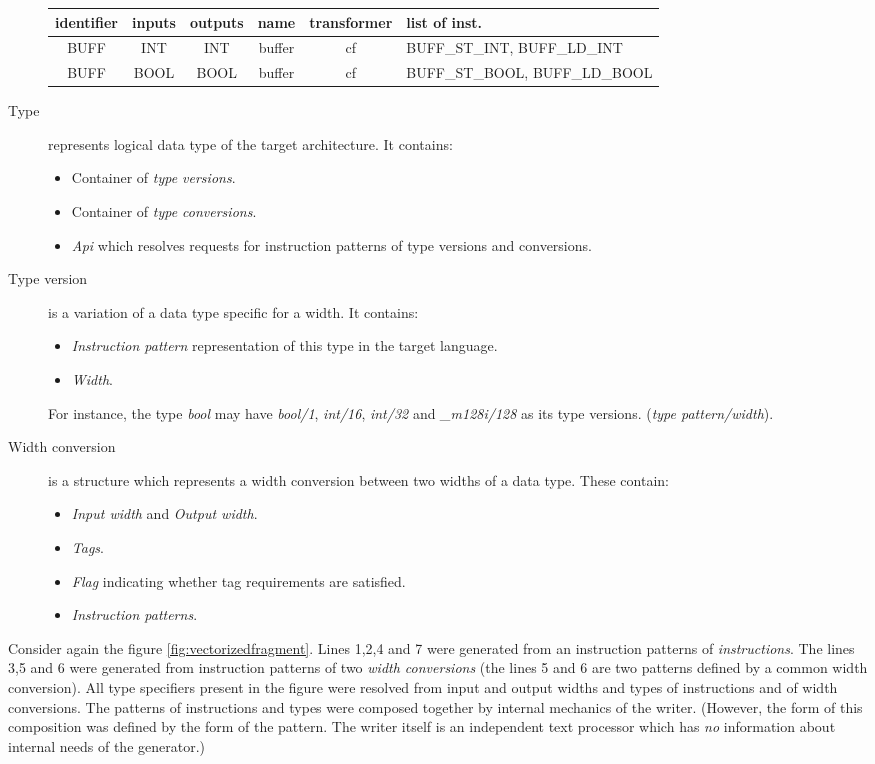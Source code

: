 \begin{description}
    \mybeginfig
    \begin{center}
      \begin{tabular}{c|c|c|c|c|p{4cm}}
        identifier & inputs & outputs & name & transformer & list of inst.\\
        \hline
        BUFF & INT & INT & buffer & cf & BUFF\_ST\_INT, BUFF\_LD\_INT \\
        BUFF & BOOL & BOOL & buffer & cf & BUFF\_ST\_BOOL, BUFF\_LD\_BOOL 
      \end{tabular}
    \end{center}
  \item[Type] represents logical data type of the target architecture. It contains:
    \begin{itemize}
      \item Container of \emph{type versions}.
      \item Container of \emph{type conversions}.
      \item \emph{Api} which resolves requests for instruction patterns of type versions and conversions.
    \end{itemize}
  \item[Type version] is a variation of a data type specific for a width. It contains:
    \begin{itemize}
      \item \emph{Instruction pattern} representation of this type in the target language.
      \item \emph{Width}.
    \end{itemize}
    For instance, the type \emph{bool} may have \emph{bool/1}, \emph{int/16}, \emph{int/32} and \emph{\_m128i/128}  as its type versions. (\emph{type pattern/width}).
  \item[Width conversion] is a structure which represents a width conversion between two widths of a data type. These contain:
    \begin{itemize}
      \item \emph{Input width} and \emph{Output width}.
      \item \emph{Tags}.
      \item \emph{Flag} indicating whether tag requirements are satisfied.
      \item \emph{Instruction patterns}.
    \end{itemize}
\end{description}

Consider again the figure \ref{fig:vectorizedfragment}. Lines 1,2,4 and 7 were generated from an instruction patterns of \emph{instructions}. The lines 3,5 and 6 were generated from instruction patterns of two \emph{width conversions} (the lines 5 and 6 are two patterns defined by a common width conversion). All type specifiers present in the figure were resolved from input and output widths and types of instructions and of width conversions. The patterns of instructions and types were composed together by internal mechanics of the writer. (However, the form of this composition was defined by the form of the pattern. The writer itself is an independent text processor which has \emph{no} information about internal needs of the generator.)

